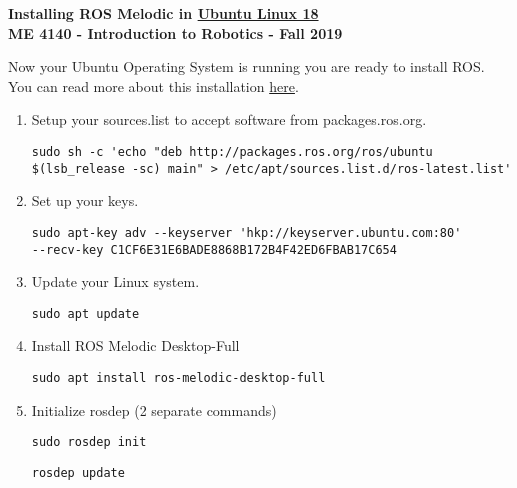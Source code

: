 \documentclass[12pt]{article}
\begin{document}
\thispagestyle{plain}

\begin{center}
	   {\bf \Large Installing ROS Melodic in {\underline{\LARGE Ubuntu Linux 18}}}\vspace{5mm} \\
   {\bf \large ME 4140 - Introduction to Robotics - Fall 2019} \vspace{2mm}\\
\end{center}



		{ Now your Ubuntu Operating System is running you are ready to install ROS. You can read more about this installation \href{http://wiki.ros.org/melodic/Installation/Ubuntu}{here}.}

\begin{enumerate}


		\item  Setup your sources.list to accept software from packages.ros.org.
\begin{verbatim}
sudo sh -c 'echo "deb http://packages.ros.org/ros/ubuntu
$(lsb_release -sc) main" > /etc/apt/sources.list.d/ros-latest.list'
\end{verbatim}			
		
\item Set up your keys. 
\begin{verbatim}
sudo apt-key adv --keyserver 'hkp://keyserver.ubuntu.com:80'
--recv-key C1CF6E31E6BADE8868B172B4F42ED6FBAB17C654
\end{verbatim}			

\item Update your Linux system. 
\begin{verbatim}
sudo apt update
\end{verbatim}	

\item Install ROS Melodic Desktop-Full 
\begin{verbatim}
sudo apt install ros-melodic-desktop-full
\end{verbatim}				

\item Initialize rosdep (2 separate commands) 
\begin{verbatim}
sudo rosdep init
\end{verbatim}	

\begin{verbatim} 
rosdep update
\end{verbatim}	


\end{enumerate}
\end{document}
